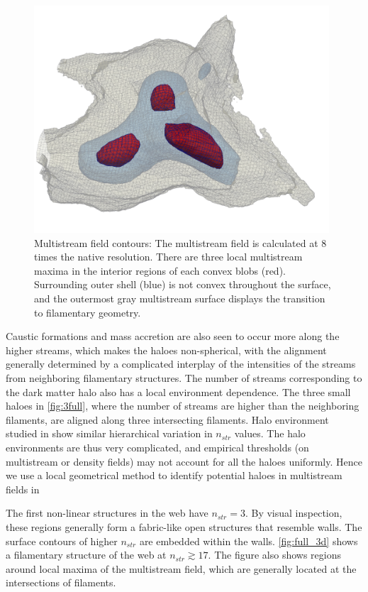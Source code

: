 \begin{figure} 
\centering\includegraphics[width=11cm]{Chapter5/Source_v2/fig2.pdf} 
\caption{Multistream field contours: The multistream field is calculated at 8 times the native resolution. There are three local multistream maxima in the interior regions of each convex blobs (red). Surrounding outer shell (blue) is not convex throughout the surface, and the outermost gray multistream surface displays the transition to filamentary geometry.}
\label{fig:3full}
\end{figure}


Caustic formations and mass accretion are also seen to occur more along the higher streams, which makes the haloes non-spherical, with the alignment generally determined by a complicated interplay  of the intensities of the streams from neighboring filamentary structures. The number of streams corresponding to the dark matter halo also has a local environment dependence. The three small haloes in \autoref{fig:3full}, where the number of streams are higher than the neighboring filaments, are aligned along three intersecting filaments. Halo environment studied in \cite{Ramachandra2015} show similar hierarchical variation in $n_{str}$ values. The halo environments are thus very complicated, and empirical thresholds (on multistream or density fields) may not account for all the haloes uniformly. Hence we use a local geometrical method to identify potential haloes in multistream fields in \cite{Ramachandra2017b}


The first non-linear structures in the web have $n_{str} = 3$. By visual inspection, these regions generally form a fabric-like open structures that resemble walls. The surface contours of higher $n_{str}$ are embedded within the walls. \autoref{fig:full_3d} shows a filamentary structure of the web at $n_{str} \gtrsim 17$. The figure also shows regions around local maxima of the multistream field, which are generally located at the intersections of filaments.    








